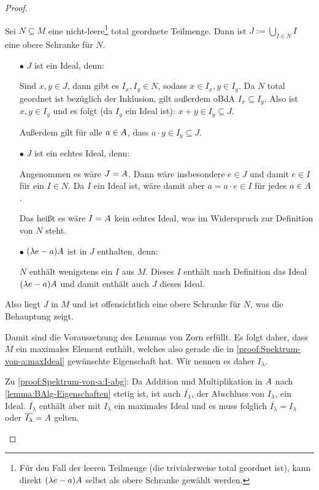 \begin{proof}
\begin{itemize}
\Beh Sei $N \subseteq M$ eine nicht-leere\footnote{Für den Fall der leeren Teilmenge (die trivialerweise total geordnet ist), kann direkt $(\lambda e-a)A$ selbst als obere Schranke gewählt werden.} total geordnete Teilmenge. Dann ist $J := \bigcup_{I \in N} I$ eine obere Schranke für $N$.
\begin{itemize}
	\item[$\bullet$] $J$ ist ein Ideal, denn:
	
	Sind $x,y \in J$, dann gibt es $I_x, I_y \in N$, sodass $x \in I_x, y \in I_y$. Da $N$ total geordnet ist bezüglich der Inklusion, gilt außerdem oBdA $I_x \subseteq I_y$. Also ist $x,y \in I_y$ und es folgt (da $I_y$ ein Ideal ist): $x+y \in I_y \subseteq J$.
	
	Außerdem gilt für alle $a \in A$, dass $a\cdot y \in I_y \subseteq J$.
	
	\item[$\bullet$] $J$ ist ein echtes Ideal, denn:
	
	Angenommen es wäre $J = A$. Dann wäre insbesondere $e \in J$ und damit $e \in I$ für ein $I \in N$. Da $I$ ein Ideal ist, wäre damit aber $a = a\cdot e \in I$ für jedes $a \in A$.
	
	Das heißt es wäre $I = A$ kein echtes Ideal, was im Widerspruch zur Definition von $N$ steht.
	
	\item[$\bullet$] $(\lambda e-a)A$ ist in $J$ enthalten, denn:
	
	$N$ enthält wenigstens ein $I$ aus $M$. Dieses $I$ enthält nach Definition das Ideal $(\lambda e-a)A$ und damit enthält auch $J$ dieses Ideal.
\end{itemize}
Also liegt $J$ in $M$ und ist offensichtlich eine obere Schranke für $N$, was die Behauptung zeigt.

Damit sind die Voraussetzung des Lemmas von Zorn erfüllt. Es folgt daher, dass $M$ ein maximales Element enthält, welches also gerade die in \ref{proof:Spektrum-von-a:maxIdeal} gewünschte Eigenschaft hat. Wir nennen es daher $I_\lambda$.

Zu \ref{proof:Spektrum-von-a:I-abg}:
Da Addition und Multiplikation in $A$ nach \cref{lemma:BAlg-Eigenschaften} stetig ist, ist auch $\overline{I_\lambda}$, der Abschluss von $I_\lambda$, ein Ideal. $\overline{I_\lambda}$ enthält aber mit $I_\lambda$ ein maximales Ideal und es                        muss folglich $\overline{I_\lambda} = I_\lambda$ oder $\overline{I_\lambda} = A$ gelten.


\end{itemize}
\end{proof}
